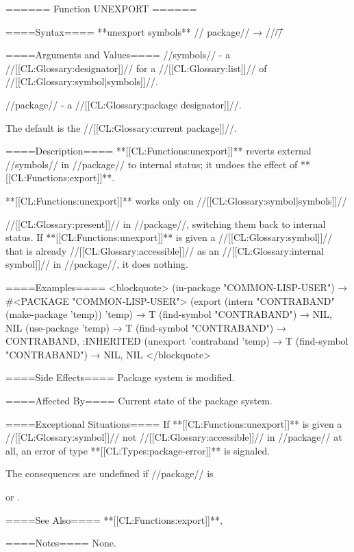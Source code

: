 ====== Function UNEXPORT ======

====Syntax====
**unexport {symbols** //\opt} package// → //\t//

====Arguments and Values====
//symbols// - a //[[CL:Glossary:designator]]// for a //[[CL:Glossary:list]]// of //[[CL:Glossary:symbol|symbols]]//.

//package// - a //[[CL:Glossary:package designator]]//.

The default is the //[[CL:Glossary:current package]]//.

====Description====
**[[CL:Functions:unexport]]** reverts external //symbols// in //package// to internal status; it undoes the effect of **[[CL:Functions:export]]**.

**[[CL:Functions:unexport]]** works only on //[[CL:Glossary:symbol|symbols]]//

//[[CL:Glossary:present]]// in //package//, switching them back to internal status. If **[[CL:Functions:unexport]]** is given a //[[CL:Glossary:symbol]]// that is already //[[CL:Glossary:accessible]]// as an //[[CL:Glossary:internal symbol]]// in //package//, it does nothing.

====Examples====
<blockquote> (in-package "COMMON-LISP-USER") → #<PACKAGE "COMMON-LISP-USER"> (export (intern "CONTRABAND" (make-package 'temp)) 'temp) → T (find-symbol "CONTRABAND") → NIL, NIL (use-package 'temp) → T (find-symbol "CONTRABAND") → CONTRABAND, :INHERITED (unexport 'contraband 'temp) → T (find-symbol "CONTRABAND") → NIL, NIL </blockquote>

====Side Effects====
Package system is modified.

====Affected By====
Current state of the package system.

====Exceptional Situations====
If **[[CL:Functions:unexport]]** is given a //[[CL:Glossary:symbol]]// not //[[CL:Glossary:accessible]]// in //package// at all, an error of type **[[CL:Types:package-error]]** is signaled.

The consequences are undefined if //package// is 

or .

====See Also====
**[[CL:Functions:export]]**, {\secref\PackageConcepts}

====Notes====
None.

